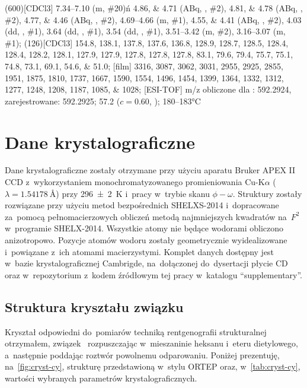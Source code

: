 \begin{fullexp}
  \NMR(600)[CDCl3] \numrange{7.34}{7.10} (m, \#{20})ń \numlist{4.86;4.71} (ABq, , \#{2}), \numlist{4.81;4.78} (ABq, , \#{2}), \numlist{4.77;4.46} (ABq, , \#{2}), \numrange{4.69}{4.66} (m, \#{1}), \numlist{4.55;4.41} (ABq, , \#{2}), \num{4.03} (dd, , \#{1}), \num{3.64} (dd, , \#{1}), \num{3.54} (dd, , \#{1}), \numrange{3.51}{3.42} (m, \#{2}), \numrange{3.16}{3.07} (m, \#{1});
  (126)[CDCl3] \numlist{154.8; 138.1; 137.8; 137.6; 136.8; 128.9; 128.7; 128.5; 128.4; 128.4; 128.2; 128.1; 127.9; 127.9; 127.8; 127.8; 127.8; 83.1; 79.6; 79.4; 75.7; 75.1; 74.8; 73.1; 69.1; 54.6; 51.0};
  [film] \numlist{3316; 3087; 3062; 3031; 2955; 2925; 2855; 1951; 1875; 1810; 1737; 1667; 1590; 1554; 1496; 1454; 1399; 1364; 1332; 1312; 1277; 1248; 1208; 1187; 1085; 1028};
  [ESI-TOF] m/z obliczone dla : \num{592.2924}, zarejestrowane: \num{592.2925};
  \data{[$\alpha^{23}_D$]~$=$} \num{57.2} ($c = 0.60$, );
   \numrange{180}{183}\si{\celsius}
\end{fullexp}

\section{Dane krystalograficzne}\label{experimental:xray}
Dane krystalograficzne zostały otrzymane przy użyciu aparatu Bruker APEX II CCD
  z~wykorzystaniem monochromatyzowanego promieniowania Cu-K$\alpha$
  ($\lambda=\SI{1.54178}{\angstrom}$) przy \SI{296(2)}{\kelvin} i~pracy w~trybie skanu $\phi-\omega$.
Struktury zostały rozwiązane przy użyciu metod bezpośrednich SHELXS-2014 
  i~dopracowane za~pomocą pełnomacierzowych obliczeń metodą najmniejszych kwadratów na~$F^2$
  w~programie SHELX-2014.
Wszystkie atomy nie będące wodorami obliczono anizotropowo.
Pozycje atomów wodoru zostały geometrycznie wyidealizowane i~powiązane z~ich atomami macierzystymi.
Komplet danych dostępny jest w~bazie krystalograficznej Cambrigde, na~dołączonej do~dysertacji płycie CD oraz w~repozytorium\sidenote{\repourl}
  z~kodem źródłowym tej pracy w~katalogu \enquote{supplementary}.

\pagebreak
\subsection{Struktura kryształu związku }
Kryształ odpowiedni do~pomiarów techniką rentgenografii strukturalnej otrzymałem,
  związek~ rozpuszczając w~mieszaninie heksanu i~eteru dietylowego,
  a~następnie poddając roztwór powolnemu odparowaniu.
Poniżej prezentuję, na~\cref{fig:cryst-cy}, strukturę przedstawioną w~stylu ORTEP
  oraz, w~\cref{tab:cryst-cy}, wartości wybranych parametrów krystalograficznych.


